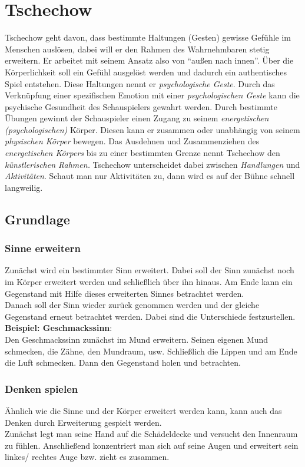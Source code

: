 \documentclass[ngerman, a4paper, twoside]{scrbook}%
\begin{document}
	\chapter{Tschechow}
	Tschechow geht davon, dass bestimmte Haltungen (Gesten) gewisse Gefühle im Menschen auslösen, dabei will er den Rahmen des Wahrnehmbaren stetig erweitern. Er arbeitet mit seinem Ansatz also von "`außen nach innen"'. Über die Körperlichkeit soll ein Gefühl ausgelöst werden und dadurch ein authentisches Spiel entstehen. Diese Haltungen nennt er \emph{psychologische Geste}. Durch das Verknüpfung einer spezifischen Emotion mit einer \emph{psychologischen Geste} kann die psychische Gesundheit des Schauspielers gewahrt werden. Durch bestimmte Übungen gewinnt der Schauspieler einen Zugang zu seinem \emph{energetischen (psychologischen)} Körper. Diesen kann er zusammen oder unabhängig von seinem \emph{physischen Körper} bewegen. Das Ausdehnen und Zusammenziehen des \emph{energetischen Körpers} bis zu einer bestimmten Grenze nennt Tschechow den \emph{künstlerischen Rahmen.} Tschechow unterscheidet dabei zwischen \emph{Handlungen} und \emph{Aktivitäten}. Schaut man nur Aktivitäten zu, dann wird es auf der Bühne schnell langweilig.
	\section{Grundlage}

	\subsection{Sinne erweitern}
	Zunächst wird ein bestimmter Sinn erweitert. Dabei soll der Sinn zunächst noch im Körper erweitert werden und schließlich über ihn hinaus. Am Ende kann ein Gegenstand mit Hilfe dieses erweiterten Sinnes betrachtet werden. \\
	Danach soll der Sinn wieder zurück genommen werden und der gleiche Gegenstand erneut betrachtet werden. Dabei sind die Unterschiede festzustellen.\\
	\textbf{Beispiel: Geschmackssinn}:\\
	Den Geschmackssinn zunächst im Mund erweitern. Seinen eigenen Mund schmecken, die Zähne, den Mundraum, usw. Schließlich die Lippen und am Ende die Luft schmecken. Dann den Gegenstand holen und betrachten.
	\subsection{Denken spielen}
	Ähnlich wie die Sinne und der Körper erweitert werden kann, kann auch das Denken durch Erweiterung gespielt werden.\\
	Zunächst legt man seine Hand auf die Schädeldecke und versucht den Innenraum zu fühlen. Anschließend konzentriert man sich auf seine Augen und erweitert sein linkes/ rechtes Auge bzw. zieht es zusammen.
\end{document}
